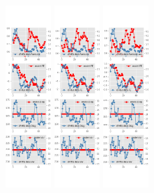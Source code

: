 \documentclass[]{article}
\begin{document}
\begin{figure}[ht]
\begin{subfigure}[b]{\textwidth}
		\includegraphics[width=0.19\textwidth]{figures/sce_ni_est_joint_diag1.png}
		\includegraphics[width=0.19\textwidth]{figures/sce_ni_est_joint_diag2.png}
		\includegraphics[width=0.19\textwidth]{figures/sce_ni_est_joint_diag3.png}

\end{subfigure}
\end{figure}
\end{document}
